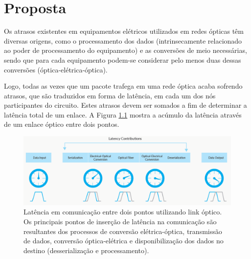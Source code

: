 \chapter{Proposta}
\label{capitulo_proposta}
Os atrasos existentes em equipamentos elétricos utilizados em redes ópticas têm diversas origens, como o processamento dos dados (intrinsecamente relacionado ao poder de processamento do equipamento) e as conversões de meio necessárias, sendo que para cada equipamento podem-se considerar pelo menos duas dessas conversões (óptica-elétrica-óptica). 

Logo, todas as vezes que um pacote trafega em uma rede óptica acaba sofrendo atrasos, que são traduzidos em forma de latência, em cada um dos nós participantes do circuito. Estes atrasos devem ser somados a fim de determinar a latência total de um enlace. A Figura \ref{fig_latency_link} mostra a acúmulo da latência através de um enlace óptico entre dois pontos. 

\begin{figure} [!htb]%
	\centering
	\includegraphics[width=1\textwidth]{./figuras/latency-link.png}
	\caption[Latência de Link]{Latência em comunicação entre dois pontos utilizando link óptico. Os principais pontos de inserção de latência na comunicação são resultantes dos processos de conversão elétrica-óptica, transmissão de dados, conversão óptica-elétrica e disponibilização dos dados no destino (desserialização e processamento).}
	\label{fig_latency_link}
\end{figure}


